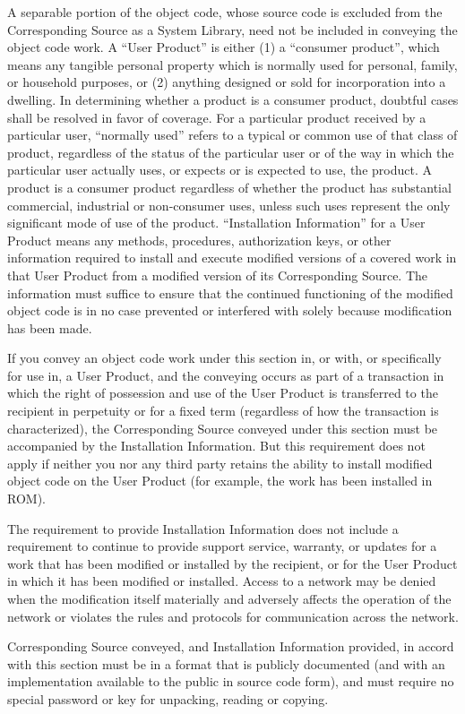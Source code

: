 A separable portion of the object code, whose source code is excluded from the Corresponding Source as a System Library, need not be included in conveying the object code work.
A “User Product” is either (1) a “consumer product”, which means any tangible personal property which is normally used for personal, family, or household purposes, or (2) anything designed or sold for incorporation into a dwelling. In determining whether a product is a consumer product, doubtful cases shall be resolved in favor of coverage. For a particular product received by a particular user, “normally used” refers to a typical or common use of that class of product, regardless of the status of the particular user or of the way in which the particular user actually uses, or expects or is expected to use, the product. A product is a consumer product regardless of whether the product has substantial commercial, industrial or non-consumer uses, unless such uses represent the only significant mode of use of the product.
“Installation Information” for a User Product means any methods, procedures, authorization keys, or other information required to install and execute modified versions of a covered work in that User Product from a modified version of its Corresponding Source. The information must suffice to ensure that the continued functioning of the modified object code is in no case prevented or interfered with solely because modification has been made.\par
If you convey an object code work under this section in, or with, or specifically for use in, a User Product, and the conveying occurs as part of a transaction in which the right of possession and use of the User Product is transferred to the recipient in perpetuity or for a fixed term (regardless of how the transaction is characterized), the Corresponding Source conveyed under this section must be accompanied by the Installation Information. But this requirement does not apply if neither you nor any third party retains the ability to install modified object code on the User Product (for example, the work has been installed in ROM).\par
The requirement to provide Installation Information does not include a requirement to continue to provide support service, warranty, or updates for a work that has been modified or installed by the recipient, or for the User Product in which it has been modified or installed. Access to a network may be denied when the modification itself materially and adversely affects the operation of the network or violates the rules and protocols for communication across the network.\par
Corresponding Source conveyed, and Installation Information provided, in accord with this section must be in a format that is publicly documented (and with an implementation available to the public in source code form), and must require no special password or key for unpacking, reading or copying.
